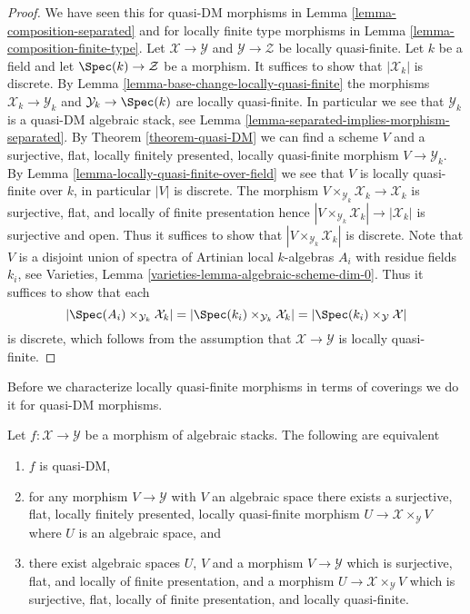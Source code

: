 \begin{proof}
We have seen this for quasi-DM morphisms in
Lemma \ref{lemma-composition-separated}
and for locally finite type morphisms in
Lemma \ref{lemma-composition-finite-type}.
Let $\mathcal{X} \to \mathcal{Y}$ and $\mathcal{Y} \to \mathcal{Z}$
be locally quasi-finite. Let $k$ be a field and let
$\Spec(k) \to \mathcal{Z}$ be a morphism.
It suffices to show that $|\mathcal{X}_k|$ is discrete. By
Lemma \ref{lemma-base-change-locally-quasi-finite}
the morphisms $\mathcal{X}_k \to \mathcal{Y}_k$
and $\mathcal{Y}_k \to \Spec(k)$ are locally quasi-finite.
In particular we see that $\mathcal{Y}_k$ is
a quasi-DM algebraic stack, see
Lemma \ref{lemma-separated-implies-morphism-separated}.
By
Theorem \ref{theorem-quasi-DM}
we can find a scheme $V$ and a surjective, flat, locally finitely presented,
locally quasi-finite morphism $V \to \mathcal{Y}_k$. By
Lemma \ref{lemma-locally-quasi-finite-over-field}
we see that $V$ is locally quasi-finite over $k$, in particular
$|V|$ is discrete. The morphism
$V \times_{\mathcal{Y}_k} \mathcal{X}_k \to \mathcal{X}_k$ is
surjective, flat, and locally of finite presentation hence
$|V \times_{\mathcal{Y}_k} \mathcal{X}_k| \to |\mathcal{X}_k|$
is surjective and open. Thus it suffices to show that
$|V \times_{\mathcal{Y}_k} \mathcal{X}_k|$ is discrete.
Note that $V$ is a disjoint union of spectra of Artinian local
$k$-algebras $A_i$ with residue fields $k_i$, see
Varieties, Lemma \ref{varieties-lemma-algebraic-scheme-dim-0}.
Thus it suffices to show that each
$$
|\Spec(A_i) \times_{\mathcal{Y}_k} \mathcal{X}_k| =
|\Spec(k_i) \times_{\mathcal{Y}_k} \mathcal{X}_k| =
|\Spec(k_i) \times_\mathcal{Y} \mathcal{X}|
$$
is discrete, which follows from the assumption that
$\mathcal{X} \to \mathcal{Y}$ is locally quasi-finite.
\end{proof}

\noindent
Before we characterize locally quasi-finite morphisms in terms of coverings
we do it for quasi-DM morphisms.

\begin{lemma}
\label{lemma-characterize-quasi-DM}
Let $f : \mathcal{X} \to \mathcal{Y}$ be a morphism of algebraic stacks.
The following are equivalent
\begin{enumerate}
\item $f$ is quasi-DM,
\item for any morphism $V \to \mathcal{Y}$ with $V$ an algebraic space
there exists a surjective, flat, locally finitely presented, locally
quasi-finite morphism $U \to \mathcal{X} \times_\mathcal{Y} V$ where
$U$ is an algebraic space, and
\item there exist algebraic spaces $U$, $V$ and a morphism
$V \to \mathcal{Y}$ which is surjective, flat, and
locally of finite presentation, and a morphism
$U \to \mathcal{X} \times_\mathcal{Y} V$ which is surjective, flat,
locally of finite presentation, and locally quasi-finite.
\end{enumerate}
\end{lemma}

